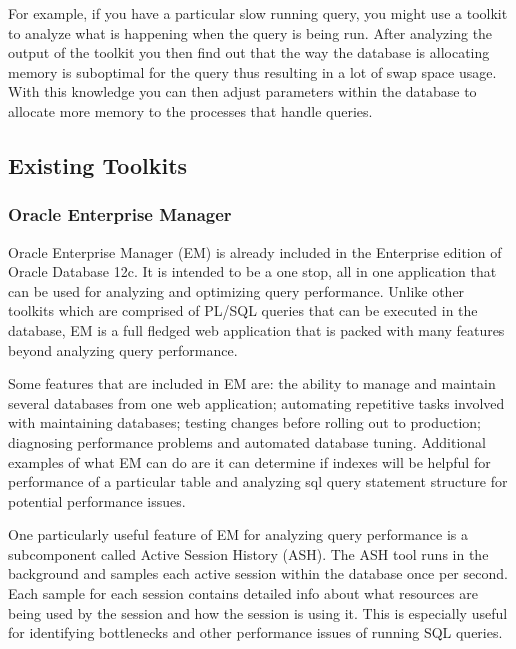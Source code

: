 \documentclass[draftclsnofoot, onecolumn, compsoc, 10pt]{IEEEtran}
\begin{document}
For example, if you have a particular slow running query, you might use a toolkit to analyze what is happening when the query is being run. 
After analyzing the output of the toolkit you then find out that the way the database is allocating memory is suboptimal for the query thus resulting in a lot of swap space usage.
With this knowledge you can then adjust parameters within the database to allocate more memory to the processes that handle queries.

\subsection{Existing Toolkits}
\subsubsection{Oracle Enterprise Manager}
Oracle Enterprise Manager (EM) is already included in the Enterprise edition of Oracle Database 12c.
It is intended to be a one stop, all in one application that can be used for analyzing and optimizing query performance. 
Unlike other toolkits which are comprised of PL/SQL queries that can be executed in the database, EM is a full fledged web application that is packed with many features beyond analyzing query performance. 

Some features that are included in EM are: the ability to manage and maintain several databases from one web application; automating repetitive tasks involved with maintaining databases; testing changes before rolling out to production; diagnosing performance problems and automated database tuning. 
Additional examples of what EM can do are it can determine if indexes will be helpful for performance of a particular table and analyzing sql query statement structure for potential performance issues.

One particularly useful feature of EM for analyzing query performance is a subcomponent called Active Session History (ASH). 
The ASH tool runs in the background and samples each active session within the database once per second. 
Each sample for each session contains detailed info about what resources are being used by the session and how the session is using it. 
This is especially useful for identifying bottlenecks and other performance issues of running SQL queries.
\end{document}
